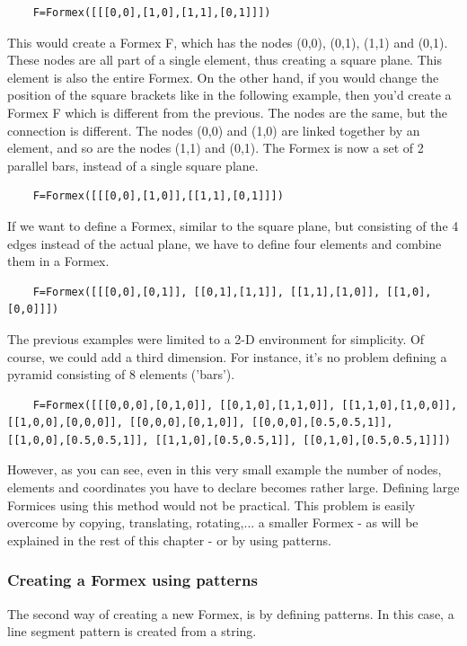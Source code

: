 \documentclass[a4paper]{manual}
\begin{document}
{\begin{verbatim}
	F=Formex([[[0,0],[1,0],[1,1],[0,1]]])
\end{verbatim}

This would create a Formex F, which has the nodes (0,0), (0,1), (1,1) and (0,1). These nodes are all part of a single element, thus creating a square plane. This element is also the entire Formex.
On the other hand, if you would change the position of the square brackets like in the following example, then you'd create a Formex F which is different from the previous. The nodes are the same, but the connection is different. The nodes (0,0) and (1,0) are linked together by an element, and so are the nodes (1,1) and (0,1). The Formex is now a set of 2 parallel bars, instead of a single square plane. 
\begin{verbatim}
	F=Formex([[[0,0],[1,0]],[[1,1],[0,1]]])
\end{verbatim}

If we want to define a Formex, similar to the square plane, but consisting of the 4 edges instead of the actual plane, we have to define four elements and combine them in a Formex.
\begin{verbatim}
	F=Formex([[[0,0],[0,1]], [[0,1],[1,1]], [[1,1],[1,0]], [[1,0],[0,0]]])
\end{verbatim}

The previous examples were limited to a 2-D environment for simplicity. Of course, we could add a third dimension. For instance, it's no problem defining a pyramid consisting of 8 elements ('bars').
\begin{verbatim}
	F=Formex([[[0,0,0],[0,1,0]], [[0,1,0],[1,1,0]], [[1,1,0],[1,0,0]], [[1,0,0],[0,0,0]], [[0,0,0],[0,1,0]], [[0,0,0],[0.5,0.5,1]], 		[[1,0,0],[0.5,0.5,1]], [[1,1,0],[0.5,0.5,1]], [[0,1,0],[0.5,0.5,1]]])
\end{verbatim}
However, as you can see, even in this very small example the number of nodes, elements and coordinates you have to declare becomes rather large. Defining large Formices using this method would not be practical. This problem is easily overcome by copying, translating, rotating,... a smaller Formex - as will be explained in the rest of this chapter - or by using patterns.
 
\subsubsection{Creating a Formex using patterns}

The second way of creating a new Formex, is by defining patterns. In this case, a line segment pattern is created from a string.

}
\end{document}

